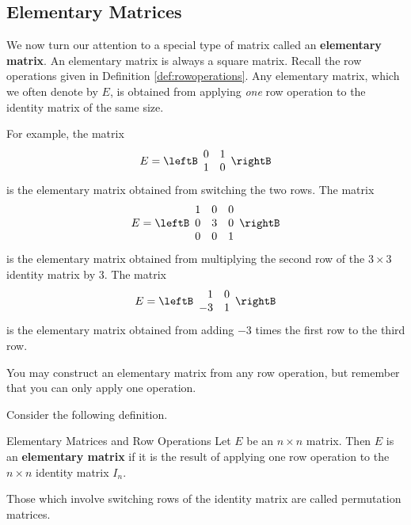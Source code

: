 
\subsection{Elementary Matrices}

We now turn our attention to a special type of matrix called an \textbf{elementary matrix}. 
An elementary matrix is always a square matrix. Recall the row operations given in Definition \ref{def:rowoperations}.
Any elementary matrix, which we often denote by $E$, is obtained from applying
{\em one\em} row operation to the identity matrix of the same size. 

For example, the matrix
\begin{equation*}
E = 
\leftB
\begin{array}{rr}
0 & 1 \\
1 & 0
\end{array}
\rightB
\end{equation*}
is the elementary matrix obtained from switching the two rows. 
The matrix 
\begin{equation*}
E = 
\leftB
\begin{array}{rrr}
1 & 0 & 0 \\
0 & 3 & 0 \\
0 & 0 & 1
\end{array}
\rightB
\end{equation*}
is the elementary matrix obtained from multiplying the second row of the $3 \times 3$ identity matrix
by $3$.
The matrix
\begin{equation*}
E = 
\leftB
\begin{array}{rr}
1 & 0 \\
-3 & 1
\end{array}
\rightB
\end{equation*}
is the elementary matrix obtained from adding $-3$ times the first row to the third row.

You may construct an elementary matrix from any row operation, but remember that you can only apply one operation.

Consider the following definition. 

\begin{definition}{Elementary Matrices and Row Operations}\label{def:elementarymatricesandrowops}
Let $E$ be an $n \times n$ matrix. Then $E$ is an \textbf{elementary matrix}  
if it is the result of applying one row operation to the $n \times n$ identity matrix $I_n$. 

Those which involve switching rows of the identity matrix are called
permutation matrices.
\end{definition}

